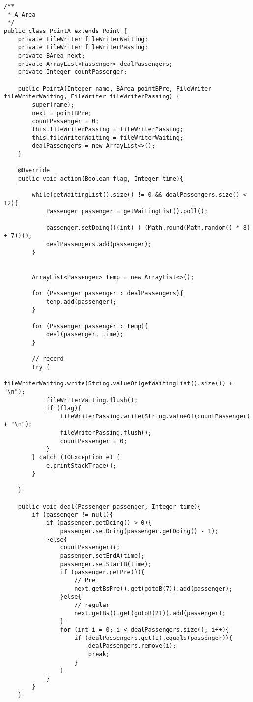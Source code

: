 \begin{lstlisting}
/**
 * A Area
 */
public class PointA extends Point {
    private FileWriter fileWriterWaiting;
    private FileWriter fileWriterPassing;
    private BArea next;
    private ArrayList<Passenger> dealPassengers;
    private Integer countPassenger;

    public PointA(Integer name, BArea pointBPre, FileWriter fileWriterWaiting, FileWriter fileWriterPassing) {
        super(name);
        next = pointBPre;
        countPassenger = 0;
        this.fileWriterPassing = fileWriterPassing;
        this.fileWriterWaiting = fileWriterWaiting;
        dealPassengers = new ArrayList<>();
    }

    @Override
    public void action(Boolean flag, Integer time){

        while(getWaitingList().size() != 0 && dealPassengers.size() < 12){
            Passenger passenger = getWaitingList().poll();

            passenger.setDoing(((int) ( (Math.round(Math.random() * 8) + 7))));
            dealPassengers.add(passenger);
        }


        ArrayList<Passenger> temp = new ArrayList<>();

        for (Passenger passenger : dealPassengers){
            temp.add(passenger);
        }

        for (Passenger passenger : temp){
            deal(passenger, time);
        }

        // record
        try {
            fileWriterWaiting.write(String.valueOf(getWaitingList().size()) + "\n");
            fileWriterWaiting.flush();
            if (flag){
                fileWriterPassing.write(String.valueOf(countPassenger) + "\n");
                fileWriterPassing.flush();
                countPassenger = 0;
            }
        } catch (IOException e) {
            e.printStackTrace();
        }

    }

    public void deal(Passenger passenger, Integer time){
        if (passenger != null){
            if (passenger.getDoing() > 0){
                passenger.setDoing(passenger.getDoing() - 1);
            }else{
                countPassenger++;
                passenger.setEndA(time);
                passenger.setStartB(time);
                if (passenger.getPre()){
                    // Pre
                    next.getBsPre().get(gotoB(7)).add(passenger);
                }else{
                    // regular
                    next.getBs().get(gotoB(21)).add(passenger);
                }
                for (int i = 0; i < dealPassengers.size(); i++){
                    if (dealPassengers.get(i).equals(passenger)){
                        dealPassengers.remove(i);
                        break;
                    }
                }
            }
        }
    }


\end{lstlisting}
